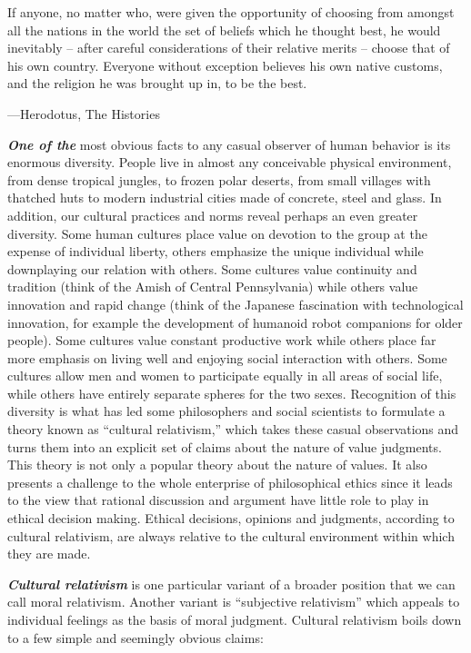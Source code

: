 \documentclass[12pt, openany]{book}
\newenvironment{epigraph}%
{
\begin{flushright}
\begin{minipage}{30em}
\begin{flushright}
\itshape
}%
{
\end{flushright}
\end{minipage}
\end{flushright}
\vspace{1em}
}
\begin{document}
\begin{epigraph}

If anyone, no matter who, were given the opportunity of choosing from amongst all the nations in the world the set of beliefs which he thought best, he would inevitably -- after careful considerations of their relative merits -- choose that of his own country. Everyone without exception believes his own native customs, and the religion he was brought up in, to be the best.

---Herodotus, The Histories

\end{epigraph}

\textbf{\emph{One of the}} most obvious facts to any casual observer of human behavior is its enormous diversity. People live in almost any conceivable physical environment, from dense tropical jungles, to frozen polar deserts, from small villages with thatched huts to modern industrial cities made of concrete, steel and glass. In addition, our cultural practices and norms reveal perhaps an even greater diversity. Some human cultures place value on devotion to the group at the expense of individual liberty, others emphasize the unique individual while downplaying our relation with others. Some cultures value continuity and tradition (think of the Amish of Central Pennsylvania) while others value innovation and rapid change (think of the Japanese fascination with technological innovation, for example the development of humanoid robot companions for older people). Some cultures value constant productive work while others place far more emphasis on living well and enjoying social interaction with others. Some cultures allow men and women to participate equally in all areas of social life, while others have entirely separate spheres for the two sexes. Recognition of this diversity is what has led some philosophers and social scientists to formulate a theory known as ``cultural relativism,'' which takes these casual observations and turns them into an explicit set of claims about the nature of value judgments. This theory is not only a popular theory about the nature of values. It also presents a challenge to the whole enterprise of philosophical ethics since it leads to the view that rational discussion and argument have little role to play in ethical decision making. Ethical decisions, opinions and judgments, according to cultural relativism, are always relative to the cultural environment within which they are made.

\textbf{\emph{Cultural relativism}} is one particular variant of a broader position that we can call moral relativism. Another variant is ``subjective relativism'' which appeals to individual feelings as the basis of moral judgment. Cultural relativism boils down to a few simple and seemingly obvious claims:
\end{document}
